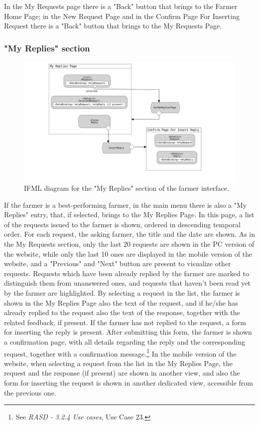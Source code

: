 \documentclass{article}
\begin{document}
\newline
In the My Requests page there is a "Back" button that brings to the Farmer Home Page; in the New Request Page and in the Confirm Page For Inserting Request there is a "Back" button that brings to the My Requests Page.

\subsubsection{"My Replies" section}
\begin{figure}[H]
    \centering
     \includegraphics[scale=0.15]{diagrams/ui diagrams/farmer/my replies.png} 
    \caption{IFML diagram for the "My Replies" section of the farmer interface.}
\end{figure}
If the farmer is a best-performing farmer, in the main menu there is also a "My Replies" entry, that, if selected, brings to the My Replies Page. In this page, a list of the requests issued to the farmer is shown, ordered in descending temporal order. For each request, the asking farmer, the title and the date are shown. As in the My Requests section, only the last 20 requests are shown in the PC version of the website, while only the last 10 ones are displayed in the mobile version of the website, and a "Previous" and "Next" button are present to visualize other requests. Requests which have been already replied by the farmer are marked to distinguish them from unanswered ones, and requests that haven't been read yet by the farmer are highlighted. \newline
By selecting a request in the list, the farmer is shown in the My Replies Page also the text of the request, and if he/she has already replied to the request also the text of the response, together with the related feedback, if present.
If the farmer has not replied to the request, a form for inserting the reply is present. After submitting this form, the farmer is shown a confirmation page, with all details regarding the reply and the corresponding request, together with a confirmation message.\footnote{See \textit{RASD - 3.2.4 Use cases}, Use Case 23.} In the mobile version of the website, when selecting a request from the list in the My Replies Page, the request and the response (if present) are shown in another view, and also the form for inserting the request is shown in another dedicated view, accessible from the previous one.\newline
\end{document}
